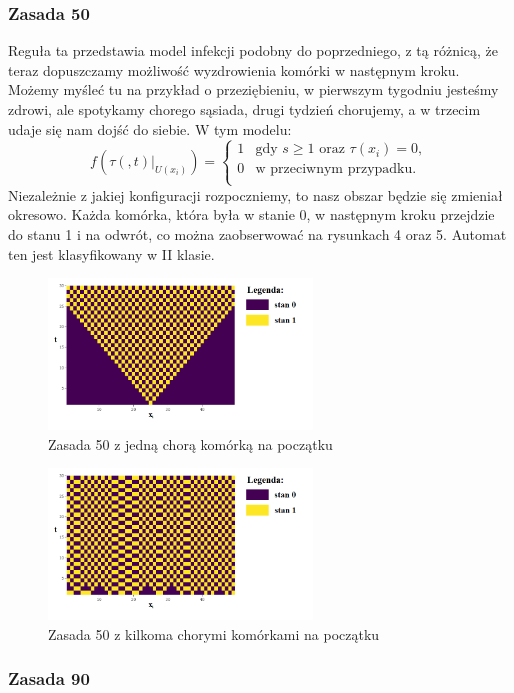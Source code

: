 \documentclass[a4paper,12pt]{article}
\begin{document}
\subsubsection{Zasada 50}
Reguła ta przedstawia model infekcji podobny do poprzedniego, z tą różnicą, że teraz dopuszczamy możliwość wyzdrowienia komórki w następnym kroku. Możemy myśleć tu na przykład o przeziębieniu, w pierwszym tygodniu jesteśmy zdrowi, ale spotykamy chorego sąsiada, drugi tydzień chorujemy, a w trzecim udaje się nam dojść do siebie. W tym modelu:
$$
f(\tau(,t)|_{U(x_i)})= \left\{ \begin{array}{ll}
1 & \textrm{gdy $s\geq1$ oraz $\tau(x_i)=0,$}\\
0 & \textrm{w przeciwnym przypadku.}\\
\end{array} \right.
$$
Niezależnie z jakiej konfiguracji rozpoczniemy, to nasz obszar będzie się zmieniał okresowo. Każda komórka, która była w stanie 0, w następnym kroku przejdzie do stanu 1 i na odwrót, co można zaobserwować na rysunkach 4 oraz 5. Automat ten jest klasyfikowany w II klasie.
\begin{figure}[h]
\centering
    \includegraphics[width=7cm]{rule50.png}
    \caption{Zasada 50 z jedną chorą komórką na początku}
    \label{fig:my_label}
\end{figure}
\clearpage
\begin{figure}[h]
    \centering
    \includegraphics[width=7cm]{rule50l.png}
    \caption{Zasada 50 z kilkoma chorymi komórkami na początku}
    \label{fig:my_label}
\end{figure}

\subsubsection{Zasada 90}
\end{document}
